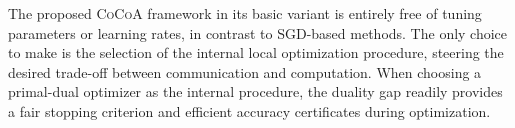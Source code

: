 \documentclass{article} %
\newcommand{\algname}{\textsc{CoCoA}\xspace}  %
\begin{document}
%
The proposed \algname framework in its basic variant is entirely free of
tuning parameters or learning rates, in contrast to SGD-based methods. The
only choice to make is the selection of the internal local optimization
procedure, steering the desired trade-off between communication and computation.
%
When choosing a primal-dual optimizer as the internal procedure, the 
duality gap readily provides a fair stopping criterion and efficient accuracy 
certificates during optimization.
\end{document}
